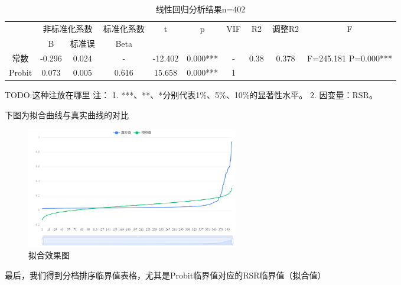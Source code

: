 \documentclass[UTF8]{ctexart}
\begin{document}
\begin{table}[!ht]
	\centering
	\caption{线性回归分析结果n=402}
	\begin{tabular}{|c|c c|c|c|c|c|c|c|c|}
		\hline
		~      & \multicolumn{2}{|c|}{非标准化系数} & 标准化系数 & \multirow{2}{*}{t} & \multirow{2}{*}{p} & \multirow{2}{*}{VIF} & \multirow{2}{*}{R2} & \multirow{2}{*}{调整R2} & \multirow{2}{*}{F}                        \\
		~      & B                                  & 标准误     & Beta               & \multirow{2}{*}{}  & \multirow{2}{*}{}    & \multirow{2}{*}{}   & \multirow{2}{*}{}       & \multirow{2}{*}{}  & \multirow{2}{*}{}    \\ \hline
		常数   & -0.296                             & 0.024      & -                  & -12.402            & 0.000***             & -                   & 0.38                    & 0.378              & F=245.181 P=0.000*** \\ \hline
		Probit & 0.073                              & 0.005      & 0.616              & 15.658             & 0.000***             & 1                   & ~                       & ~                  & ~                    \\ \hline
	\end{tabular}
\end{table}


TODO:这种注放在哪里
注：
1. ***、**、*分别代表1\%、5\%、10\%的显著性水平。
2. 因变量：RSR。

下图为拟合曲线与真实曲线的对比

\begin{figure}[H]\centering
	\includegraphics[width=0.45\textwidth]{img/fit.png} %
	\caption{拟合效果图} %
	\label{fig:figure 1} %
\end{figure}

最后，我们得到分档排序临界值表格，尤其是Probit临界值对应的RSR临界值（拟合值）
\end{document}
